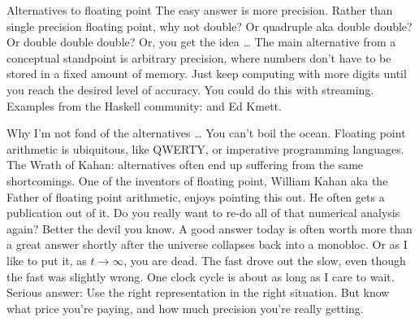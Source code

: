 \documentclass{beamer}
\begin{document}
\begin{frame}{Alternatives to floating point}
The easy answer is more precision. Rather than single precision floating point, why not double? Or
quadruple aka double double? Or double double double? Or, you get the idea \ldots
The main alternative from a conceptual standpoint is arbitrary precision, where numbers don't have to be
stored in a fixed amount of memory.
Just keep computing with more digits until you reach the desired level of accuracy. You could do this with
streaming.
Examples from the Haskell community: and Ed Kmett.
\end{frame}

\begin{frame}{Why I'm not fond of the alternatives \ldots}
You can't boil the ocean. Floating point arithmetic is ubiquitous, like QWERTY, or imperative programming
languages.
The Wrath of Kahan: alternatives often end up suffering from the same shortcomings. One of the inventors of
floating point, William Kahan aka the Father of floating point arithmetic, enjoys pointing this out. He often gets a publication out of it.
Do you really want to re-do all of that numerical analysis again? Better the devil you know.
A good answer today is often worth more than a great answer shortly after the universe collapses back into a 
monobloc. Or as I like to put it, as $t \to \infty$, you are dead.
The fast drove out the slow, even though the fast was slightly wrong.
One clock cycle is about as long as I care to wait.
Serious answer: Use the right representation in the right situation. But know what price you're paying, and
how much precision you're really getting.
\end{frame}

\end{document}

